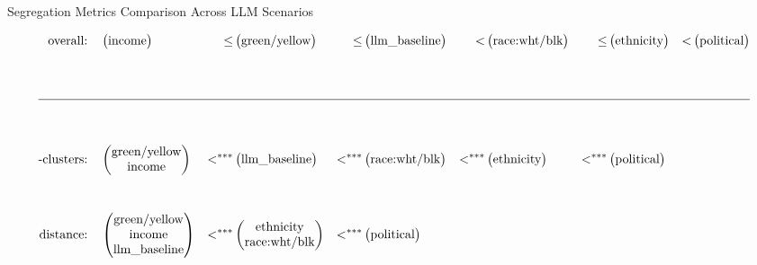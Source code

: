 \begin{table}[htbp]
\centering
\caption{Segregation Metrics Comparison Across LLM Scenarios}
\label{tab:segregation_metrics_llm}
\vspace{1.5em}
\begin{align*}
\text{overall:} & \quad \begin{pmatrix} \text{income} \end{pmatrix} & \leq & \begin{pmatrix} \text{green/yellow} \end{pmatrix} & \leq & \begin{pmatrix} \text{llm\_baseline} \end{pmatrix} & < & \begin{pmatrix} \text{race:wht/blk} \end{pmatrix} & \leq & \begin{pmatrix} \text{ethnicity} \end{pmatrix} & < & \begin{pmatrix} \text{political} \end{pmatrix} \\\\[2.5em]
\hline \\\\[0.5em]
\text{-clusters:} & \quad \begin{pmatrix} \text{green/yellow} \\ \text{income} \end{pmatrix} & <^{***} & \begin{pmatrix} \text{llm\_baseline} \end{pmatrix} & <^{***} & \begin{pmatrix} \text{race:wht/blk} \end{pmatrix} & <^{***} & \begin{pmatrix} \text{ethnicity} \end{pmatrix} & <^{***} & \begin{pmatrix} \text{political} \end{pmatrix} \\\\[1em]
\text{distance:} & \quad \begin{pmatrix} \text{green/yellow} \\ \text{income} \\ \text{llm\_baseline} \end{pmatrix} & <^{***} & \begin{pmatrix} \text{ethnicity} \\ \text{race:wht/blk} \end{pmatrix} & <^{***} & \begin{pmatrix} \text{political} \end{pmatrix} \\\\[2em]

\end{align*}
\end{table}
